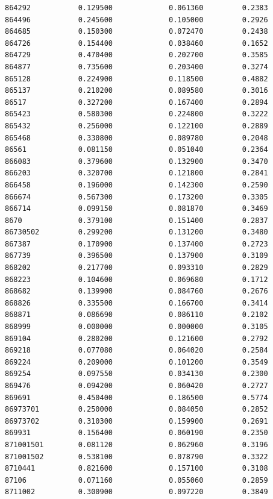 \documentclass[
  letterpaper,
  DIV=11,
  numbers=noendperiod]{scrartcl}
\begin{document}
\begin{verbatim}
864292           0.129500             0.061360         0.2383
864496           0.245600             0.105000         0.2926
864685           0.150300             0.072470         0.2438
864726           0.154400             0.038460         0.1652
864729           0.470400             0.202700         0.3585
864877           0.735600             0.203400         0.3274
865128           0.224900             0.118500         0.4882
865137           0.210200             0.089580         0.3016
86517            0.327200             0.167400         0.2894
865423           0.580300             0.224800         0.3222
865432           0.256000             0.122100         0.2889
865468           0.330800             0.089780         0.2048
86561            0.081150             0.051040         0.2364
866083           0.379600             0.132900         0.3470
866203           0.320700             0.121800         0.2841
866458           0.196000             0.142300         0.2590
866674           0.567300             0.173200         0.3305
866714           0.099150             0.081870         0.3469
8670             0.379100             0.151400         0.2837
86730502         0.299200             0.131200         0.3480
867387           0.170900             0.137400         0.2723
867739           0.396500             0.137900         0.3109
868202           0.217700             0.093310         0.2829
868223           0.104600             0.069680         0.1712
868682           0.139900             0.084760         0.2676
868826           0.335500             0.166700         0.3414
868871           0.086690             0.086110         0.2102
868999           0.000000             0.000000         0.3105
869104           0.280200             0.121600         0.2792
869218           0.077080             0.064020         0.2584
869224           0.209000             0.101200         0.3549
869254           0.097550             0.034130         0.2300
869476           0.094200             0.060420         0.2727
869691           0.450400             0.186500         0.5774
86973701         0.250000             0.084050         0.2852
86973702         0.310300             0.159900         0.2691
869931           0.156400             0.060190         0.2350
871001501        0.081120             0.062960         0.3196
871001502        0.538100             0.078790         0.3322
8710441          0.821600             0.157100         0.3108
87106            0.071160             0.055060         0.2859
8711002          0.300900             0.097220         0.3849

\end{verbatim}
\end{document}
